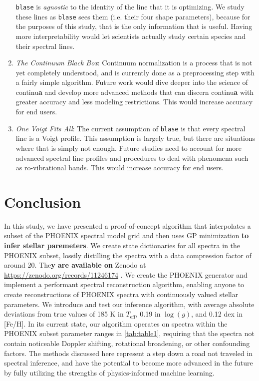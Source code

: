 \documentclass[twocolumn, linenumbers]{aastex631}
\begin{document}
\begin{enumerate}[label=-]
    \texttt{blase} is \textit{agnostic} to the identity of the line that it is optimizing.
    We study these lines as \texttt{blase} sees them (i.e. their four shape parameters), because for the purposes of this study, that is the only information that is useful.
    Having more interpretability would let scientists actually study certain species and their spectral lines.
    \item \textit{The Continuum Black Box}: Continuum normalization is a process that is not yet completely understood, and is currently done as a preprocessing step with a fairly simple algorithm.
    Future work would dive deeper into the science of continu\textbf{a} and develop more advanced methods that can discern continu\textbf{a} with greater accuracy and less modeling restrictions.
    This would increase accuracy for end users.
    \item \textit{One Voigt Fits All}: The current assumption of \texttt{blase} is that every spectral line is a Voigt profile.
    This assumption is largely true, but there are situations where that is simply not enough.
    Future studies need to account for more advanced spectral line profiles and procedures to deal with phenomena such as ro-vibrational bands.
    This would increase accuracy for end users.
\end{enumerate}

\section{Conclusion}
In this study, we have presented a proof-of-concept algorithm that interpolates a subset of the PHOENIX spectral model grid and then uses GP minimization \textbf{to infer stellar paremeters}.
We create state dictionaries for all spectra in the PHOENIX subset, lossily distilling the spectra with a data compression factor of around 20. 
The\textbf{y are available on} Zenodo at \url{https://zenodo.org/records/11246174} \citep{zenodo}.
We create the PHOENIX generator and implement a performant spectral reconstruction algorithm, enabling anyone to create reconstructions of PHOENIX spectra with continuously valued stellar parameters.
We introduce and test our inference algorithm, with average absolute deviations from true values of 185 K in $T_\mathrm{eff}$, 0.19 in $\log(g)$, and 0.12 dex in [Fe/H].
In its current state, our algorithm operates on spectra within the PHOENIX subset parameter ranges in \autoref{tab:table1}, requiring that the spectra not contain noticeable Doppler shifting, rotational broadening, or other confounding factors.
The methods discussed here represent a step down a road not traveled in spectral inference, and have the potential to become more advanced in the future by fully utilizing the strengths of physics-informed machine learning.
\end{document}

